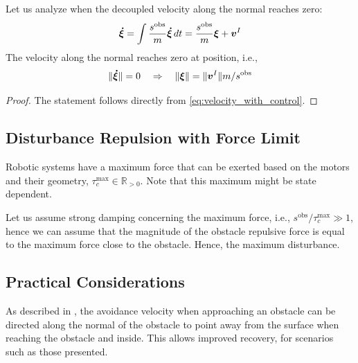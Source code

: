 \documentclass[conference]{IEEEtran}
\begin{document}
Let us analyze when the decoupled velocity along the normal reaches zero:
\begin{equation}
    \vecs{\dot \xi} = \int \frac{s^{\mathrm{obs}}}{m} \vecs{\dot \xi} \, dt = \frac{s^{\mathrm{obs}}}{m} \vecs{\xi} + \vecs v^I \label{eq:velocity_with_control}
\end{equation}
The velocity along the normal reaches zero at position, i.e., 
\begin{equation}
    \| \boldsymbol{\dot \xi} \| = 0
    \quad \Rightarrow \quad
    \|\boldsymbol{\xi} \| = \| \boldsymbol{v}^I \| {m} / {s^{\mathrm{obs}}} 
\end{equation}

\begin{lemma}

\end{lemma}

\begin{proof}
The statement follows directly from \eqref{eq:velocity_with_control}.
\end{proof}

\subsection{Disturbance Repulsion with Force Limit}
Robotic systems have a maximum force that can be exerted based on the motors and their geometry, $\tau_c^{\mathrm{max}} \in \mathbb{R}_{>0}$. Note that this maximum might be state dependent.

Let  us assume strong damping concerning the maximum force, i.e., $s^{\mathrm{obs}} / \tau_c^{\mathrm{max}} \gg 1$, hence we can assume that the magnitude of the obstacle repulsive force is equal to the maximum force close to the obstacle. Hence, the maximum disturbance.

\subsection{Practical Considerations}
As described in \cite{huber2022avoiding, huber2023avoidance}, the avoidance velocity when approaching an obstacle can be directed along the normal of the obstacle to point away from the surface when reaching the obstacle and inside. This allows improved recovery, for scenarios such as those presented.
\end{document}
